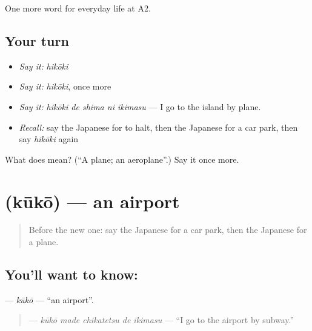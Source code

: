 \begin{grammarlens}[title={What you've built}]
One more word for everyday life at A2.
\end{grammarlens}

\subsection*{Your turn}
\begin{itemize}
\raggedright
  \item \emph{Say it:} \emph{hikōki}
  \item \emph{Say it:} \emph{hikōki}, once more
  \item \emph{Say it:} \emph{hikōki de shima ni ikimasu} — I go to the island by plane.
  \item \emph{Recall:} say the Japanese for to halt, then the Japanese for a car park, then say \emph{hikōki} again
\end{itemize}

\begin{tcolorbox}[breakable,colback=teal!4,colframe=teal!35!black,title={Before you move on}]
What does  mean? (\textquotedblleft{}A plane; an aeroplane\textquotedblright{}.) Say it once more.
\end{tcolorbox}
\section[\texorpdfstring{\ja{くうこう} (kūkō)}{くうこう (kūkō)}]{ (kūkō) — an airport}

\label{lesson:JA-C203-kuukou}



\begin{quote}
Before the new one: say the Japanese for a car park, then the Japanese for a plane.
\end{quote}

\subsection*{You'll want to know: }
\textbf{} — \emph{kūkō} — \textquotedblleft{}an airport\textquotedblright{}.

\begin{quote}
\textbf{  } — \emph{kūkō made chikatetsu de ikimasu} — \textquotedblleft{}I go to the airport by subway.\textquotedblright{}
\end{quote}

